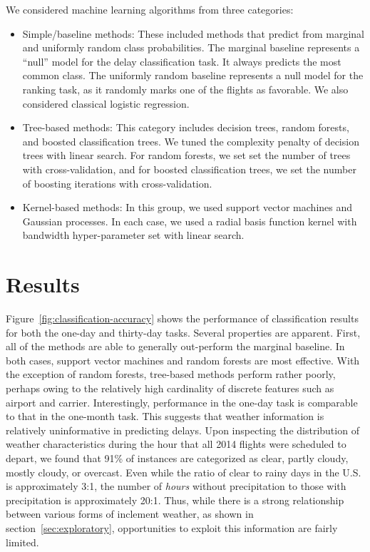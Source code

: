 \documentclass[twocolumn]{article}
\begin{document}
We considered machine learning algorithms from three categories:
\begin{itemize}
    \item Simple/baseline methods: These included methods that predict from marginal and uniformly random class probabilities. The marginal baseline represents a ``null'' model for the delay classification task. It always predicts the most common class. The uniformly random baseline represents a null model for the ranking task, as it randomly marks one of the flights as favorable. We also considered classical logistic regression.
    \item Tree-based methods: This category includes decision trees, random forests, and boosted classification trees. We tuned the complexity penalty of decision trees with linear search. For random forests, we set set the number of trees with cross-validation, and for boosted classification trees, we set the number of boosting iterations with cross-validation.
    \item Kernel-based methods: In this group, we used support vector machines and Gaussian processes. In each case, we used a radial basis function kernel with bandwidth hyper-parameter set with linear search.
\end{itemize}

\section{Results}
\label{sec:results}

Figure~\ref{fig:classification-accuracy} shows the performance of classification results for both the one-day and thirty-day tasks. Several properties are apparent. First, all of the methods are able to generally out-perform the marginal baseline. In both cases, support vector machines and random forests are most effective. With the exception of random forests, tree-based methods perform rather poorly, perhaps owing to the relatively high cardinality of discrete features such as airport and carrier. Interestingly, performance in the one-day task is comparable to that in the one-month task. This suggests that weather information is relatively uninformative in predicting delays. Upon inspecting the distribution of weather characteristics during the hour that all 2014 flights were scheduled to depart, we found that 91\% of instances are categorized as clear, partly cloudy, mostly cloudy, or overcast. Even while the ratio of clear to rainy days in the U.S. is approximately 3:1, the number of \emph{hours} without precipitation to those with precipitation is approximately 20:1. Thus, while there is a strong relationship between various forms of inclement weather, as shown in section~\ref{sec:exploratory}, opportunities to exploit this information are fairly limited.
\end{document}
